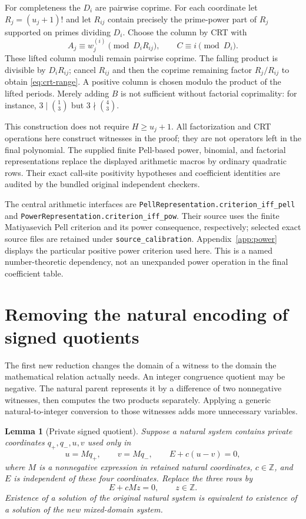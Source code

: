 \documentclass[11pt,letterpaper]{article}
\newtheorem{lemma}[theorem]{Lemma}
\theoremstyle{definition}
\newcommand{\Z}{\mathbb Z}
\begin{document}
For completeness the $D_i$ are pairwise coprime. For each coordinate
let $R_j=(u_j+1)!$ and let $R_{ij}$ contain precisely the prime-power
part of $R_j$ supported on primes dividing $D_i$. Choose the column by
CRT with
\[
A_j\equiv w_j^{(i)}\pmod{D_iR_{ij}},\qquad
C\equiv i\pmod{D_i}.
\]
These lifted column moduli remain pairwise coprime.
The falling product is divisible by $D_iR_{ij}$; cancel $R_{ij}$ and
then the coprime remaining factor $R_j/R_{ij}$ to obtain
\eqref{eq:crt-range}. A positive column is chosen modulo the product of
the lifted periods. Merely adding $B$ is not sufficient without
factorial coprimality: for instance, $3\mid\binom13$ but
$3\nmid\binom43$.

This construction does not require $H\ge u_j+1$. All factorization and
CRT operations here construct witnesses in the proof; they are not
operators left in the final polynomial. The supplied finite Pell-based
power, binomial, and factorial representations replace the displayed
arithmetic macros by ordinary quadratic rows. Their exact call-site
positivity hypotheses and coefficient identities are audited by the
bundled original independent checkers.

The central arithmetic interfaces are
\texttt{PellRepresentation.criterion\_iff\_pell} and
\texttt{PowerRepresentation.criterion\_iff\_pow}. Their source uses
the finite Matiyasevich Pell criterion and its power consequence,
respectively; selected exact source files are retained under
\texttt{source\_calibration}. Appendix~\ref{app:power} displays the
particular positive power criterion used here. This is a named
number-theoretic dependency, not an unexpanded power operation in
the final coefficient table.

\section{Removing the natural encoding of signed quotients}
\label{sec:quotients}

The first new reduction changes the domain of a witness to the domain
the mathematical relation actually needs. An integer congruence
quotient may be negative. The natural parent represents it by a
difference of two nonnegative witnesses, then computes the two products
separately. Applying a generic natural-to-integer conversion to those
witnesses adds more unnecessary variables.

\begin{lemma}[Private signed quotient]
\label{lem:signed}
Suppose a natural system contains private coordinates $q_+,q_-,u,v$
used only in
\[
u=Mq_+,\qquad v=Mq_-,\qquad E+c(u-v)=0,
\]
where $M$ is a nonnegative expression in retained natural coordinates,
$c\in\Z$, and $E$ is independent of these four coordinates. Replace the
three rows by
\[
E+cMz=0,\qquad z\in\Z.
\]
Existence of a solution of the original natural system is equivalent to
existence of a solution of the new mixed-domain system.
\end{lemma}
\end{document}
